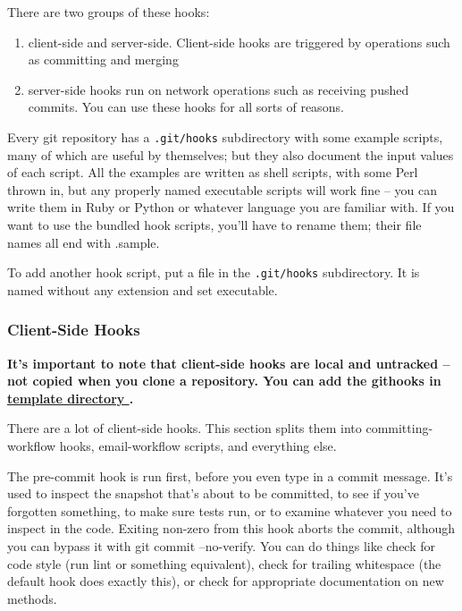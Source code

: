 There are two groups of these hooks: 

\begin{enumerate}
  \item client-side and server-side. Client-side hooks are triggered by operations such as committing and merging
  \item server-side hooks run on network operations such as receiving pushed commits. You can use these hooks for all sorts of reasons.
\end{enumerate}




Every git repository has a \texttt{.git/hooks} subdirectory with some example scripts, many of which are useful by themselves; but they also document the input values of each script. All the examples are written as shell scripts, with some Perl thrown in, but any properly named executable scripts will work fine – you can write them in Ruby or Python or whatever language you are familiar with. If you want to use the bundled hook scripts, you’ll have to rename them; their file names all end with .sample.

To add another hook script, put a file in the \texttt{.git/hooks} subdirectory. It is named without any extension and set executable.

\subsubsection{Client-Side Hooks}%


\textbf{It’s important to note that client-side hooks are local and untracked -- not copied when you clone a repository. You can add the githooks in \href{https://git-scm.com/docs/git-init\#\_template\_directory}{template directory }.}


There are a lot of client-side hooks. This section splits them into committing-workflow hooks, email-workflow scripts, and everything else.




The pre-commit hook is run first, before you even type in a commit message. It’s used to inspect the snapshot that’s about to be committed, to see if you’ve forgotten something, to make sure tests run, or to examine whatever you need to inspect in the code. Exiting non-zero from this hook aborts the commit, although you can bypass it with git commit --no-verify. You can do things like check for code style (run lint or something equivalent), check for trailing whitespace (the default hook does exactly this), or check for appropriate documentation on new methods.


